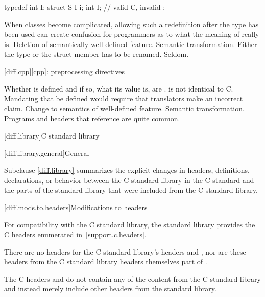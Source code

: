 \begin{example}
\begin{codeblock}
typedef int I;
struct S {
  I i;
  int I;            // valid C, invalid \Cpp{}
};
\end{codeblock}
\end{example}
\rationale
When classes become complicated, allowing such a redefinition
after the type has been used can create confusion for \Cpp{}
programmers as to what the meaning of  really is.
\effect
Deletion of semantically well-defined feature.
\difficulty
Semantic transformation.
Either the type or the struct member has to be renamed.
\howwide
Seldom.

[diff.cpp]{\ref*{cpp}: preprocessing directives}

\change
Whether  is defined and if so, what its value is, are
.
\rationale
\Cpp{} is not identical to C\@.
Mandating that 
be defined would require that translators make an incorrect claim.
\effect
Change to semantics of well-defined feature.
\difficulty
Semantic transformation.
\howwide
Programs and headers that reference  are
quite common.

[diff.library]{C standard library}

[diff.library.general]{General}
%

\pnum
Subclause \ref{diff.library} summarizes the explicit changes in headers,
definitions, declarations, or behavior between the C standard library
in the C standard and the parts of the \Cpp{} standard library that were
included from the C standard library.

[diff.mods.to.headers]{Modifications to headers}

\pnum
For compatibility with the C standard library,
the \Cpp{} standard library provides the C headers enumerated
in~\ref{support.c.headers}.

\pnum
There are no \Cpp{} headers for the C standard library's headers
 and ,
nor are these headers from the C standard library headers themselves part of \Cpp{}.

\pnum
The C headers  and
 do not contain any of the content from
the C standard library and instead merely include other headers from the \Cpp{}
standard library.

